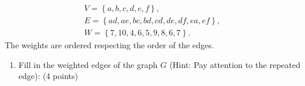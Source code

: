 \documentclass[12pt]{exam}
\begin{document}
\begin{enumerate}
\begin{gather*}
    V=\left\lbrace a,b,c,d,e,f\right\rbrace,\\
    E=\left\lbrace ad,ae,bc,bd,cd,de,df,ea,ef\right\rbrace,\\
    W=\left\lbrace 7,10,4,6,5,9,8,6,7\right\rbrace.
\end{gather*}
The weights are ordered respecting the order of the edges.
\begin{enumerate}
\item \label{firstQnSec2} Fill in the weighted edges of the graph $G$ (Hint: Pay attention to the repeated edge): (4 points)
\begin{figure}[h!]
    \centering
   



    \begin{tikzpicture}[x=0.75pt,y=0.75pt,yscale=-1,xscale=1]
    

\end{tikzpicture}
\end{figure}
\end{enumerate}
\end{enumerate}
\end{document}
